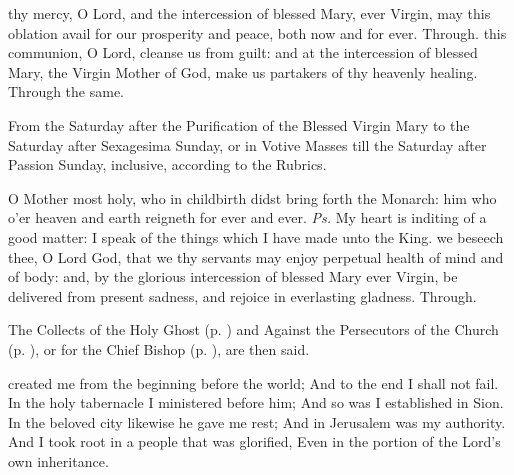 \secret
{} thy mercy, O Lord, and the intercession of blessed Mary, ever Virgin, may this oblation avail for our prosperity and peace, both now and for ever. Through.
\postcommunion
{} this communion, O Lord, cleanse us from guilt: and at the intercession of blessed Mary, the Virgin Mother of God, make us partakers of thy heavenly healing. Through the same.


\begin{rubric}
    {From the Saturday after the Purification of the Blessed Virgin Mary to the Saturday after Sexagesima Sunday, or in Votive Masses till the Saturday after Passion Sunday, inclusive, according to the Rubrics.}
\end{rubric}
\introit
{} O Mother most holy, who in childbirth didst bring forth the Monarch: him who o'er heaven and earth reigneth for ever and ever. \textit{Ps.} My heart is inditing of a good matter: I speak of the things which I have made unto the King.
\collect
{} we beseech thee, O Lord God, that we thy servants may enjoy perpetual health of mind and of body: and, by the glorious intercession of blessed Mary ever Virgin, be delivered from present sadness, and rejoice in everlasting gladness. Through.
\begin{rubric}
    The Collects of the Holy Ghost (p. \pageref{SPHolyGhost}) and Against the Persecutors of the Church (p. \pageref{SPAgainst}), or for the Chief Bishop (p. \pageref{SPChiefBishop}), are then said.
\end{rubric}
 created me from the beginning before the world; And to the end I shall not fail. In the holy tabernacle I ministered before him; And so was I established in Sion. In the beloved city likewise he gave me rest; And in Jerusalem was my authority. And I took root in a people that was glorified, Even in the portion of the Lord’s own inheritance.
